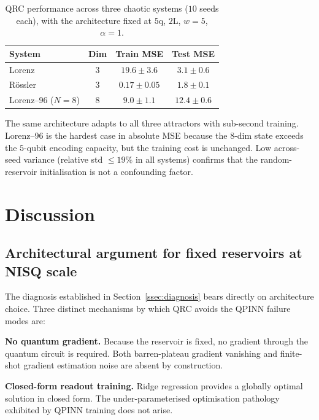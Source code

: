 \documentclass[11pt,a4paper]{article}
\begin{document}
\begin{table}[h]
    \centering
    \caption{QRC performance across three chaotic systems
      ($10$ seeds each), with the architecture fixed at
      $5$q, $2$L, $w=5$, $\alpha=1$.}
    \label{tab:multisystem}
    \begin{tabular}{lccc}
        \toprule
        \textbf{System}    & \textbf{Dim} & \textbf{Train MSE} & \textbf{Test MSE} \\
        \midrule
        Lorenz             & $3$  & $19.6 \pm 3.6$ & $3.1 \pm 0.6$ \\
        R\"{o}ssler        & $3$  & $0.17 \pm 0.05$ & $1.8 \pm 0.1$ \\
        Lorenz--96 ($N=8$) & $8$  & $9.0 \pm 1.1$ & $12.4 \pm 0.6$ \\
        \bottomrule
    \end{tabular}
\end{table}

The same architecture adapts to all three attractors with sub-second
training. Lorenz--96 is the hardest case in absolute MSE because the
$8$-dim state exceeds the $5$-qubit encoding capacity, but the
training cost is unchanged. Low across-seed variance (relative std
$\le 19\%$ in all systems) confirms that the random-reservoir
initialisation is not a confounding factor.

\section{Discussion}

\subsection{Architectural argument for fixed reservoirs at NISQ scale}

The diagnosis established in Section~\ref{ssec:diagnosis} bears
directly on architecture choice. Three distinct mechanisms by which
QRC avoids the QPINN failure modes are:

\textbf{No quantum gradient.} Because the reservoir is fixed, no
gradient through the quantum circuit is required. Both barren-plateau
gradient vanishing and finite-shot gradient estimation noise are
absent by construction.

\textbf{Closed-form readout training.} Ridge regression provides a
globally optimal solution in closed form. The under-parameterised
optimisation pathology exhibited by QPINN training does not arise.
\end{document}
